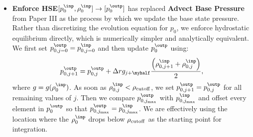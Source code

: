 \begin{itemize}
\item {\bf Enforce HSE}$[p_0^{\inp},\rho_0^{\inp}]
  \rightarrow [p_0^{\outp}]$ has replaced {\bf Advect Base Pressure}
  from Paper III as the process by which we update the base state
  pressure.  Rather than discretizing the evolution equation for
  $p_0$, we enforce hydrostatic equilibrium directly, which is numerically simpler
  and analytically equivalent.  We first set 
  $p_{0,j=0}^{\outp} = p_{0,j=0}^{\inp}$ and then update $p_0^\outp$ using:
\begin{equation}
p_{0,j+1}^{\outp} = p_{0,j}^{\outp} + \Delta r g_{j+\myhalf}\frac{\left(\rho_{0,j+1}^{\inp}+\rho_{0,j}^{\inp}\right)}{2},
\end{equation}
  where $g=g(\rho_0^\inp)$.  As soon as $\rho_{0,j}^\inp < \rho_{\rm cutoff}$, we set 
  $p_{0,j+1}^\outp = p_{0,j}^\outp$ for all remaining values of $j$.  
  Then we compare $p_{0,j_{\rm max}}^\outp$ with $p_{0,j_{\rm max}}^\inp$ and offset
  every element in $p_0^\outp$ so that $p_{0,j_{\rm max}}^\outp = p_{0,j_{\rm max}}^\inp$.  
  We are effectively using the location where the $\rho_0^\inp$ drops below 
  $\rho_{\rm cutoff}$ as the starting point for integration.



\end{itemize}
